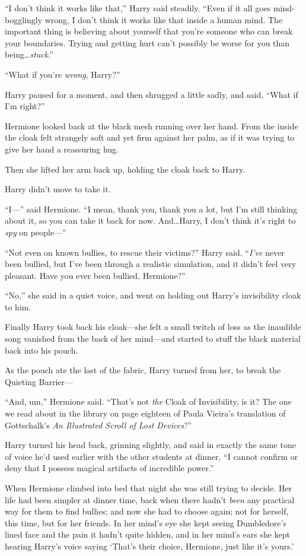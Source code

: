 “I don’t think it works like that,” Harry said steadily. “Even if it all goes mind-bogglingly wrong, I don’t think it works like that inside a human mind. The important thing is believing about yourself that you’re someone who can break your boundaries. Trying and getting hurt can’t possibly be worse for you than being…\emph{stuck}.”

“What if you’re \emph{wrong}, Harry?”

Harry paused for a moment, and then shrugged a little sadly, and said, “What if I’m right?”

Hermione looked back at the black mesh running over her hand. From the inside the cloak felt strangely soft and yet firm against her palm, as if it was trying to give her hand a reassuring hug.

Then she lifted her arm back up, holding the cloak back to Harry.

Harry didn’t move to take it.

“I—” said Hermione. “I mean, thank you, thank you a lot, but I’m still thinking about it, so you can take it back for now. And…Harry, I don’t think it’s right to \emph{spy} on people—”

“Not even on known bullies, to rescue their victims?” Harry said. “\emph{I’ve} never been bullied, but I’ve been through a realistic simulation, and it didn’t feel very pleasant. Have you ever been bullied, Hermione?”

“No,” she said in a quiet voice, and went on holding out Harry’s invisibility cloak to him.

Finally Harry took back his cloak—she felt a small twitch of loss as the inaudible song vanished from the back of her mind—and started to stuff the black material back into his pouch.

As the pouch ate the last of the fabric, Harry turned from her, to break the Quieting Barrier—

“And, um,” Hermione said. “That’s not \emph{the} Cloak of Invisibility, is it? The one we read about in the library on page eighteen of Paula Vieira’s translation of Gottschalk’s \emph{An Illustrated Scroll of Lost Devices}?”

Harry turned his head back, grinning slightly, and said in exactly the same tone of voice he’d used earlier with the other students at dinner, “I cannot confirm or deny that I possess magical artifacts of incredible power.”

\later

When Hermione climbed into bed that night she was still trying to decide. Her life had been simpler at dinner time, back when there hadn’t \emph{been} any practical way for them to find bullies; and now she had to choose again; not for herself, this time, but for her friends. In her mind’s eye she kept seeing Dumbledore’s lined face and the pain it hadn’t quite hidden, and in her mind’s ears she kept hearing Harry’s voice saying ‘That’s their choice, Hermione, just like it’s yours.’

